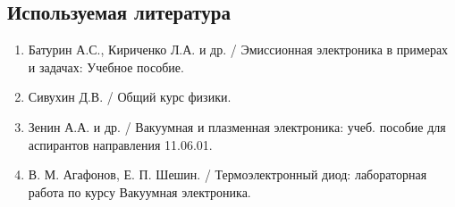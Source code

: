 \documentclass[12pt]{article}
\begin{document}
\subsection*{Используемая литература}
\begin{enumerate}
    \item Батурин А.С., Кириченко Л.А. и др. / Эмиссионная электроника в примерах и задачах: Учебное пособие.
    \item Сивухин Д.В. / Общий курс физики.
    \item Зенин А.А. и др. / Вакуумная и плазменная электроника: учеб. пособие для аспирантов направления 11.06.01.
    \item В. М. Агафонов, Е. П. Шешин. / Термоэлектронный диод: лабораторная работа по курсу Вакуумная электроника.
\end{enumerate}
\end{document}
